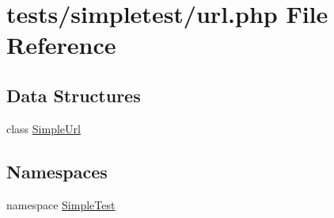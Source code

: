 \hypertarget{url_8php}{\section{tests/simpletest/url.php File Reference}
\label{url_8php}
}
\subsection*{Data Structures}
\begin{DoxyCompactItemize}
\item 
class \hyperlink{class_simple_url}{Simple\-Url}
\end{DoxyCompactItemize}
\subsection*{Namespaces}
\begin{DoxyCompactItemize}
\item 
namespace \hyperlink{namespace_simple_test}{Simple\-Test}
\end{DoxyCompactItemize}
